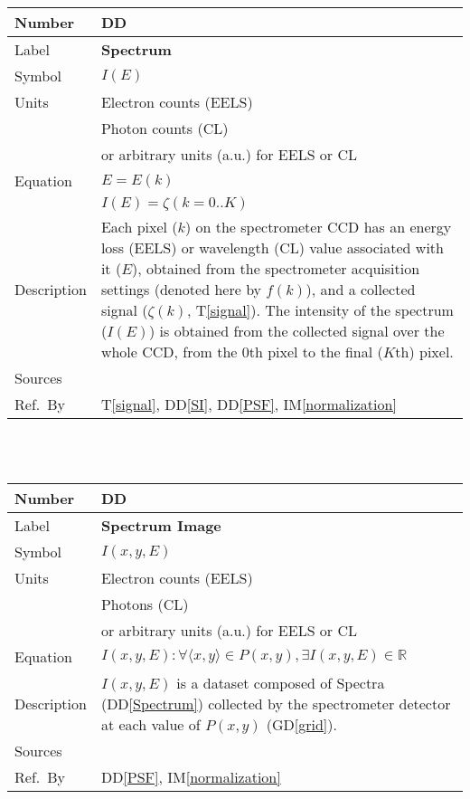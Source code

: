 \documentclass[12pt]{article}
\newcommand{\colAwidth}{0.13\textwidth}
\newcommand{\colBwidth}{0.82\textwidth}
\newcounter{defnum} %
\newcommand{\dref}[1]{GD\ref{#1}}
\newcounter{datadefnum} %
\newcommand{\ddref}[1]{DD\ref{#1}}
\newcommand{\tref}[1]{T\ref{#1}}
\newcommand{\iref}[1]{IM\ref{#1}}
\begin{document}
\noindent
\begin{minipage}{\textwidth}
	\renewcommand*{\arraystretch}{1.5}
	\begin{tabular}{| p{\colAwidth} | p{\colBwidth}|}
		\hline
		\rowcolor[gray]{0.9}
		Number& DD{datadefnum}\thedatadefnum \label{Spectrum}\\
		\hline
		Label& \bf Spectrum\\
		\hline
		Symbol & $I(E)$\\
		\hline
		Units & Electron counts (EELS)\\
		& Photon counts (CL)\\
		& or arbitrary units (a.u.) for EELS or CL\\
		  \hline
		  Equation & $E = E(k)$\\
		  & $I(E) = \zeta(k=0..K)$\\
		  \hline
		  Description & Each pixel ($k$) on the spectrometer CCD has an energy loss (EELS) or wavelength (CL) value associated with it ($E$), obtained from the spectrometer acquisition settings (denoted here by $f(k)$), and a collected signal ($\zeta(k)$, \tref{signal}). The intensity of the spectrum ($I(E)$) is obtained from the collected signal over the whole CCD, from the 0th pixel to the final ($K$th) pixel.\\
		  \hline
		  Sources & \cite{egerton_introduction_2011} \\
		  \hline
		  Ref.\ By & \tref{signal}, \ddref{SI}, \ddref{PSF}, \iref{normalization}\\
		  \hline
	\end{tabular}
\end{minipage}\\

~\newline

\noindent
\begin{minipage}{\textwidth}
\renewcommand*{\arraystretch}{1.5}
\begin{tabular}{| p{\colAwidth} | p{\colBwidth}|}
	\hline
	\rowcolor[gray]{0.9}
	Number& DD{datadefnum}\thedatadefnum \label{SI}\\
	\hline
	Label& \bf Spectrum Image\\
	\hline
	Symbol &$I(x, y, E)$\\
	\hline
	Units & Electron counts (EELS)\\
	& Photons (CL)\\
	& or arbitrary units (a.u.) for EELS or CL\\
	\hline
	Equation& $I(x, y, E): \forall \langle x, y \rangle \in P(x,y), \exists I(x,y,E) \in \mathbb{R}$\\
	\hline
	Description & $I(x, y, E)$ is a dataset composed of Spectra (\ddref{Spectrum}) collected by the spectrometer detector at each value of $P(x,y)$ (\dref{grid}).
	\\
	\hline
	Sources&~\cite{jeanguillaume_spectrum-image:_1989}  \\
	\hline
	Ref.\ By & \ddref{PSF}, \iref{normalization}\\
	\hline
\end{tabular}
\end{minipage}\\
\end{document}
